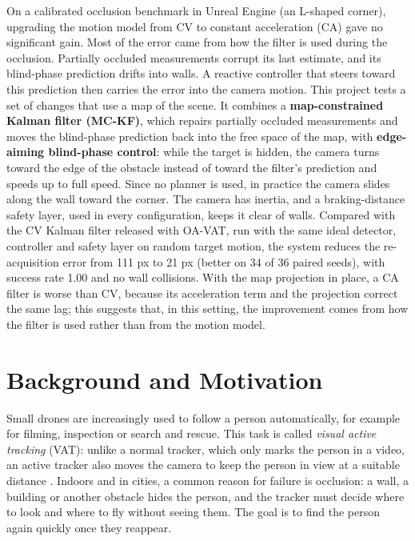 \documentclass[12pt,a4paper]{article}
\begin{document}
On a calibrated occlusion benchmark in Unreal Engine (an L-shaped corner), upgrading the motion model from CV to constant acceleration (CA) gave no significant gain. Most of the error came from how the filter is used during the occlusion. Partially occluded measurements corrupt its last estimate, and its blind-phase prediction drifts into walls. A reactive controller that steers toward this prediction then carries the error into the camera motion. This project tests a set of changes that use a map of the scene. It combines a \textbf{map-constrained Kalman filter (MC-KF)}, which repairs partially occluded measurements and moves the blind-phase prediction back into the free space of the map, with \textbf{edge-aiming blind-phase control}: while the target is hidden, the camera turns toward the edge of the obstacle instead of toward the filter's prediction and speeds up to full speed. Since no planner is used, in practice the camera slides along the wall toward the corner. The camera has inertia, and a braking-distance safety layer, used in every configuration, keeps it clear of walls. Compared with the CV Kalman filter released with OA-VAT, run with the same ideal detector, controller and safety layer on random target motion, the system reduces the re-acquisition error from 111 px to 21 px (better on 34 of 36 paired seeds), with success rate 1.00 and no wall collisions.
With the map projection in place, a CA filter is worse than CV, because its acceleration term and the projection correct the same lag; this suggests that, in this setting, the improvement comes from how the filter is used rather than from the motion model.

\clearpage
\tableofcontents
\clearpage
\section{Background and Motivation}
Small drones are increasingly used to follow a person automatically, for example for filming, inspection or search and rescue.
This task is called \emph{visual active tracking} (VAT): unlike a normal tracker, which only marks the person in a video, an active tracker also moves the camera to keep the person in view at a suitable distance \cite{r1,r2}.
Indoors and in cities, a common reason for failure is occlusion: a wall, a building or another obstacle hides the person, and the tracker must decide where to look and where to fly without seeing them.
The goal is to find the person again quickly once they reappear.
\end{document}
